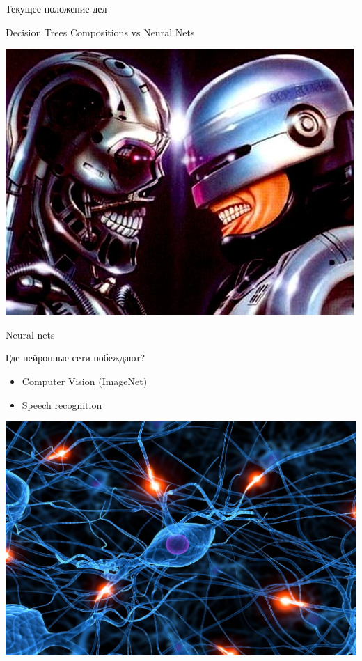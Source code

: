 \documentclass[10pt]{beamer}
\begin{document}
\begin{frame}{Текущее положение дел}
\begin{center}
\begin{block}{Decision Trees Compositions vs Neural Nets}
\end{block}
    \includegraphics[scale=0.4]{images/termvsrobo.jpg}
\end{center}
\end{frame}

\begin{frame}{Neural nets}
\begin{center}
\begin{block}{Где нейронные сети побеждают?}
\begin{itemize}
    \item Computer Vision (ImageNet)
    \item Speech recognition
\end{itemize}
\end{block}
    \includegraphics[scale=0.3]{images/nn.jpg}
\end{center}
\end{frame}
\end{document}
